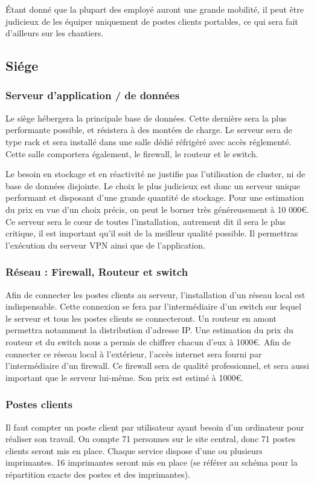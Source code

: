     Étant donné que la plupart des employé auront une grande mobilité, il peut être judicieux de les équiper uniquement de postes clients portables, ce qui sera fait d'ailleurs sur les chantiers.

    \subsection{Siége}

        \subsubsection{Serveur d'application / de données}
            Le siège hébergera la principale base de données. Cette dernière sera la plus performante possible, et résistera à des montées de charge. Le serveur sera de type rack et sera installé dans une salle dédié réfrigéré avec accès réglementé. Cette salle comportera également, le firewall, le routeur et le switch.

            Le besoin en stockage et en réactivité ne justifie pas l'utilisation de cluster, ni de base de données disjointe. Le choix le plus judicieux est donc un serveur unique performant et disposant d'une grande quantité de stockage. Pour une estimation du prix en vue d'un choix précis, on peut le borner très généreusement à 10 000€.
            Ce serveur sera le cœur de toutes l'installation, autrement dit il sera le plus critique, il est important qu'il soit de la meilleur qualité possible. Il permettras l'exécution du serveur VPN ainsi que de l'application.

        \subsubsection{Réseau : Firewall, Routeur et switch}
            Afin de connecter les postes clients au serveur, l'installation d'un réseau local est indispensable. Cette connexion se fera par l'intermédiaire d'un switch sur lequel le serveur et tous les postes clients se connecteront. Un routeur en amont permettra notamment la distribution d'adresse IP. Une estimation du prix du routeur et du switch nous a permis de chiffrer chacun d'eux à 1000€.
            Afin de connecter ce réseau local à l'extérieur, l'accès internet sera fourni par l'intermédiaire d'un firewall. Ce firewall sera de qualité professionnel, et sera aussi important que le serveur lui-même. Son prix est estimé à 1000€.
        
        \subsubsection{Postes clients}
            Il faut compter un poste client par utilisateur ayant besoin d'un ordinateur pour réaliser son travail. On compte 71 personnes sur le site central, donc 71 postes clients seront mis en place. Chaque service dispose d'une ou plusieurs imprimantes. 16 imprimantes seront mis en place (se référer au schéma pour la répartition exacte des postes et des imprimantes).

